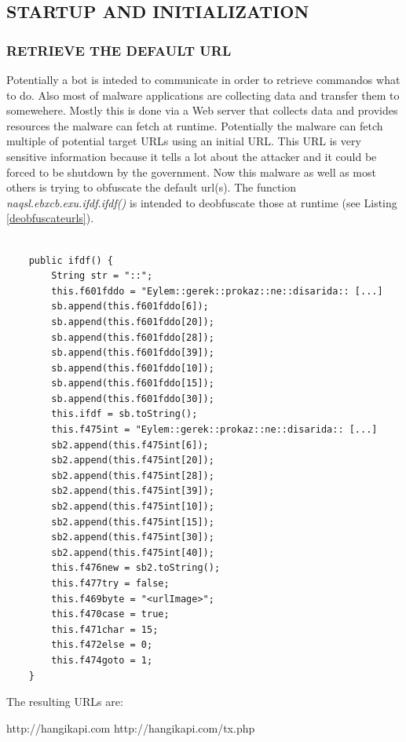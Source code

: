 \documentclass[10pt,titlepage]{article}
\begin{document}
\subsection{STARTUP AND INITIALIZATION}
\subsubsection{RETRIEVE THE DEFAULT URL}
Potentially a bot is inteded to communicate in order to retrieve commandos what to do. Also most of malware applications are collecting data and transfer them to somewehere. Mostly this is done via a Web server that collects data and provides resources the malware can fetch at runtime. Potentially the malware can fetch multiple of potential target URLs using an initial URL. This URL is very sensitive information because it tells a lot about the attacker and it could be forced to be shutdown by the government. Now this malware as well as most others is trying to obfuscate the default url(s). The function \textit{naqsl.ebxcb.exu.ifdf.ifdf()} is intended to deobfuscate those at runtime (see Listing \ref{deobfuscateurls}).

\begin{lstlisting}[label=deobfuscateurls,caption=The function \textit{naqsl.ebxcb.exu.ifdf.ifdf()} deobfuscates the default URLs.,frame=tb]

    public ifdf() {
        String str = "::";
        this.f601fddo = "Eylem::gerek::prokaz::ne::disarida:: [...]
        sb.append(this.f601fddo[6]);
        sb.append(this.f601fddo[20]);
        sb.append(this.f601fddo[28]);
        sb.append(this.f601fddo[39]);
        sb.append(this.f601fddo[10]);
        sb.append(this.f601fddo[15]);
        sb.append(this.f601fddo[30]);
        this.ifdf = sb.toString();
        this.f475int = "Eylem::gerek::prokaz::ne::disarida:: [...]
        sb2.append(this.f475int[6]);
        sb2.append(this.f475int[20]);
        sb2.append(this.f475int[28]);
        sb2.append(this.f475int[39]);
        sb2.append(this.f475int[10]);
        sb2.append(this.f475int[15]);
        sb2.append(this.f475int[30]);
        sb2.append(this.f475int[40]);
        this.f476new = sb2.toString();
        this.f477try = false;
        this.f469byte = "<urlImage>";
        this.f470case = true;
        this.f471char = 15;
        this.f472else = 0;
        this.f474goto = 1;
    }
\end{lstlisting}

The resulting URLs are:

\begin{spverbatim}
http://hangikapi.com
http://hangikapi.com/tx.php
\end{spverbatim}
\end{document}
